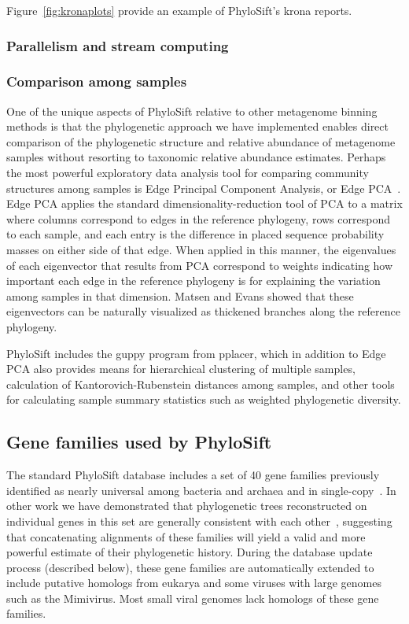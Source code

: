 \documentclass[10pt]{article}
\begin{document}
Figure~\ref{fig:kronaplots} provide an example of PhyloSift's krona reports.

\subsubsection*{Parallelism and stream computing}

\subsubsection*{Comparison among samples}

One of the unique aspects of PhyloSift relative to other metagenome binning methods is that the phylogenetic approach we have implemented enables direct comparison of the phylogenetic structure and relative abundance of metagenome samples without resorting to taxonomic relative abundance estimates.
Perhaps the most powerful exploratory data analysis tool for comparing community structures among samples is Edge Principal Component Analysis, or Edge PCA~\cite{Matsen2012}.
Edge PCA applies the standard dimensionality-reduction tool of PCA to a matrix where columns correspond to edges in the reference phylogeny, rows correspond to each sample, and each entry is the difference in placed sequence probability masses on either side of that edge.
When applied in this manner, the eigenvalues of each eigenvector that results from PCA correspond to weights indicating how important each edge in the reference phylogeny is for explaining the variation among samples in that dimension.
Matsen and Evans showed that these eigenvectors can be naturally visualized as thickened branches along the reference phylogeny.

PhyloSift includes the guppy program from pplacer, which in addition to Edge PCA also provides means for hierarchical clustering of multiple samples, calculation of Kantorovich-Rubenstein distances among samples, and other tools for calculating sample summary statistics such as weighted phylogenetic diversity.

\subsection*{Gene families used by PhyloSift}

The standard PhyloSift database includes a set of 40 gene families previously identified as nearly universal among bacteria and archaea and in single-copy~\cite{DongyingWu2012}.
In other work we have demonstrated that phylogenetic trees reconstructed on individual genes in this set are generally consistent with each other~\cite{Lang2012}, suggesting that concatenating alignments of these families will yield a valid and more powerful estimate of their phylogenetic history.
During the database update process (described below), these gene families are automatically extended to include putative homologs from eukarya and some viruses with large genomes such as the Mimivirus.
Most small viral genomes lack homologs of these gene families.
\end{document}

